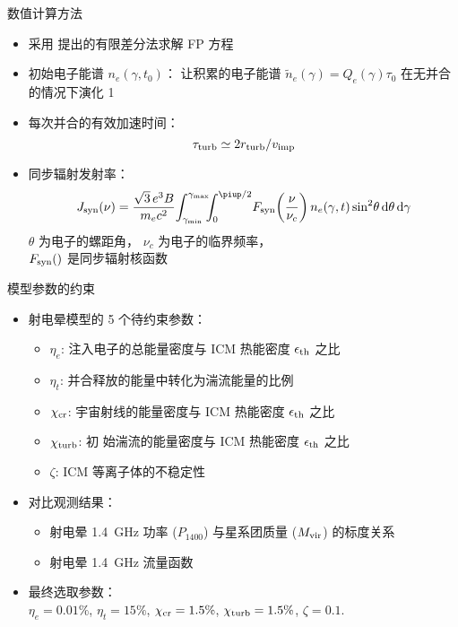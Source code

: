 \documentclass{beamer}
\begin{document}
\begin{frame}{数值计算方法}
  \begin{itemize}
    \item 采用 \cite{chang1970} 提出的有限差分法求解 FP 方程
    \item 初始电子能谱 $n_e(\gamma, t_0)$：
      让积累的电子能谱 $\tilde{n}_e(\gamma) = Q_e(\gamma) \tau_0$
      在无并合的情况下演化 \SI{1}{\Gyr}
    \item 每次并合的有效加速时间：
      \begin{equation}
        \tau_{\text{turb}} \simeq 2 r_{\text{turb}} / v_{\text{imp}}
      \end{equation}
    \item 同步辐射发射率：
      \begin{equation}
        J_{\R{syn}}(\nu) =
          \frac{\sqrt{3} \,e^3 B}{m_e c^2}
          \!\int_{\gamma_{\R{min}}}^{\gamma_{\R{max}}}
          \!\!\!\int_0^{\Cpi/2}
          \! F_{\R{syn}} \!\left( \frac{\nu}{\nu_c} \right)
          n_e(\gamma, t) \sin^2 \!\theta \,\D{\theta} \,\D{\gamma}
      \end{equation}
      $\theta$ 为电子的螺距角，
      $\nu_c$ 为电子的临界频率，\\
      $F_{\text{syn}}()$ 是同步辐射核函数
  \end{itemize}
\end{frame}

\begin{frame}{模型参数的约束}
  \begin{itemize}
    \item 射电晕模型的 5 个待约束参数：
      \begin{itemize}
        \item $\eta_e$:
          注入电子的总能量密度与 ICM 热能密度 $\epsilon_{\text{th}}$ 之比
        \item $\eta_t$:
          并合释放的能量中转化为湍流能量的比例
        \item $\chi_{\text{cr}}$:
          宇宙射线的能量密度与 ICM 热能密度 $\epsilon_{\text{th}}$ 之比
        \item $\chi_{\text{turb}}$:
          初  始湍流的能量密度与 ICM 热能密度 $\epsilon_{\text{th}}$ 之比
        \item $\zeta$:
          ICM 等离子体的不稳定性
      \end{itemize}
    \item 对比观测结果：
      \begin{itemize}
        \item 射电晕 \SI{1.4}{\GHz} 功率 ($P_{1400}$)
          与星系团质量 ($M_{\text{vir}}$) 的标度关系
        \item 射电晕 \SI{1.4}{\GHz} 流量函数
      \end{itemize}
    \item 最终选取参数：\\
      $\eta_e = 0.01\%$,
      $\eta_t = 15\%$,
      $\chi_{\text{cr}} = 1.5\%$,
      $\chi_{\text{turb}} = 1.5\%$,
      $\zeta = 0.1$.
  \end{itemize}
\end{frame}
\end{document}
